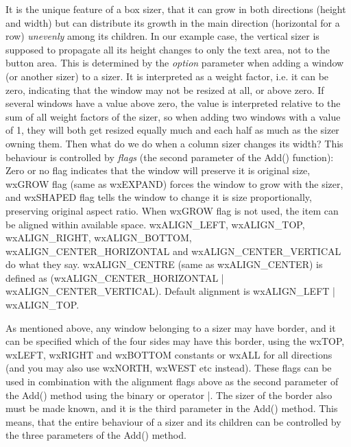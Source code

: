 It is the unique feature of a box sizer, that it can grow in both directions (height and
width) but can distribute its growth in the main direction (horizontal for a row) {\it unevenly} 
among its children. In our example case, the vertical sizer is supposed to propagate all its
height changes to only the text area, not to the button area. This is determined by the {\it option} parameter
when adding a window (or another sizer) to a sizer. It is interpreted
as a weight factor, i.e. it can be zero, indicating that the window may not be resized
at all, or above zero. If several windows have a value above zero, the value is interpreted
relative to the sum of all weight factors of the sizer, so when adding two windows with
a value of 1, they will both get resized equally much and each half as much as the sizer
owning them. Then what do we do when a column sizer changes its width? This behaviour is
controlled by {\it flags} (the second parameter of the Add() function): Zero or no flag
indicates that the window will preserve it is original size, wxGROW flag (same as wxEXPAND)
forces the window to grow with the sizer, and wxSHAPED flag tells the window to change it is
size proportionally, preserving original aspect ratio.  When wxGROW flag is not used,
the item can be aligned within available space.  wxALIGN\_LEFT, wxALIGN\_TOP, wxALIGN\_RIGHT,
wxALIGN\_BOTTOM, wxALIGN\_CENTER\_HORIZONTAL and wxALIGN\_CENTER\_VERTICAL do what they say.
wxALIGN\_CENTRE (same as wxALIGN\_CENTER) is defined as (wxALIGN\_CENTER\_HORIZONTAL |
wxALIGN\_CENTER\_VERTICAL).  Default alignment is wxALIGN\_LEFT | wxALIGN\_TOP.

As mentioned above, any window belonging to a sizer may have border, and it can be specified
which of the four sides may have this border, using the wxTOP, wxLEFT, wxRIGHT and wxBOTTOM
constants or wxALL for all directions (and you may also use wxNORTH, wxWEST etc instead). These
flags can be used in combination with the alignment flags above as the second parameter of the
Add() method using the binary or operator |. The sizer of the border also must be made known,
and it is the third parameter in the Add() method. This means, that the entire behaviour of
a sizer and its children can be controlled by the three parameters of the Add() method.

